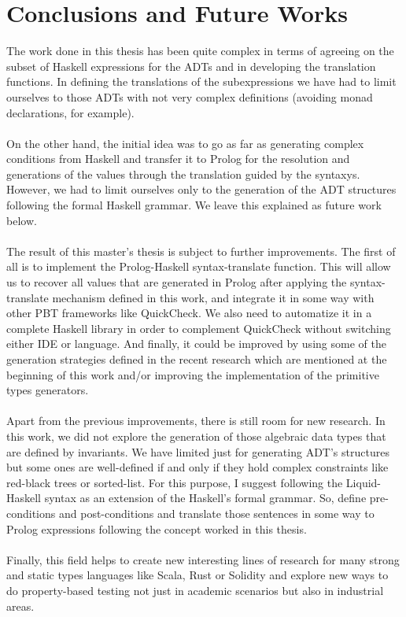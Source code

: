 \chapter{Conclusions and Future Works}

The work done in this thesis has been quite complex in terms of agreeing on the subset of Haskell expressions for the ADTs and in developing the translation functions. In defining the translations of the subexpressions we have had to limit ourselves to those ADTs with not very complex definitions (avoiding monad declarations, for example).\\\\
On the other hand, the initial idea was to go as far as generating complex conditions from Haskell and transfer it to Prolog for the resolution and generations of the values through the translation guided by the syntaxys. However, we had to limit ourselves only to the generation of the ADT structures following the formal Haskell grammar. We leave this explained as future work below.\\\\
The result of this master's thesis is subject to further improvements. The first of all is to implement the Prolog-Haskell syntax-translate function. This will allow us to recover all values that are generated in Prolog after applying the syntax-translate mechanism defined in this work, and integrate it in some way with other PBT frameworks like QuickCheck. We also need to automatize it in a complete Haskell library in order to complement QuickCheck without switching either IDE or language. And finally, it could be improved by using some of the generation strategies defined in the recent research which are mentioned at the beginning of this work and/or improving the implementation of the primitive types generators.\\\\
Apart from the previous improvements, there is still room for new research. In this work, we did not explore the generation of those algebraic data types that are defined by invariants. We have limited just for generating ADT's structures but some ones are well-defined if and only if they hold complex constraints like red-black trees or sorted-list. For this purpose, I suggest following the Liquid-Haskell syntax as an extension of the Haskell's formal grammar. So, define pre-conditions and post-conditions and translate those sentences in some way to Prolog expressions following the concept worked in this thesis.\\\\
Finally, this field helps to create new interesting lines of research for many strong and static types languages like Scala, Rust or Solidity and explore new ways to do property-based testing not just in academic scenarios but also in industrial areas.


